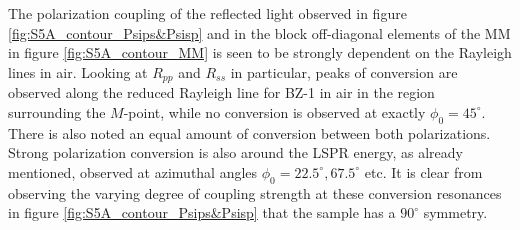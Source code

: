 The polarization coupling of the reflected light observed in figure \ref{fig:S5A_contour_Psips&Psisp} and in the block off-diagonal elements of the MM in figure \ref{fig:S5A_contour_MM} is seen to be strongly dependent on the Rayleigh lines in air. Looking at $R_{pp}$ and $R_{ss}$ in particular, peaks of conversion are observed along the reduced Rayleigh line for BZ-1 in air in the region surrounding the $M$-point, while no conversion is observed at exactly $\phi_0=45^\circ$. There is also noted an equal amount of conversion between both polarizations. Strong polarization conversion is also around the LSPR energy, as already mentioned, observed at azimuthal angles $\phi_0=22.5^\circ, 67.5^\circ$ etc. It is clear from observing the varying degree of coupling strength at these conversion resonances in figure \ref{fig:S5A_contour_Psips&Psisp} that the sample has a $90^\circ$ symmetry.
























